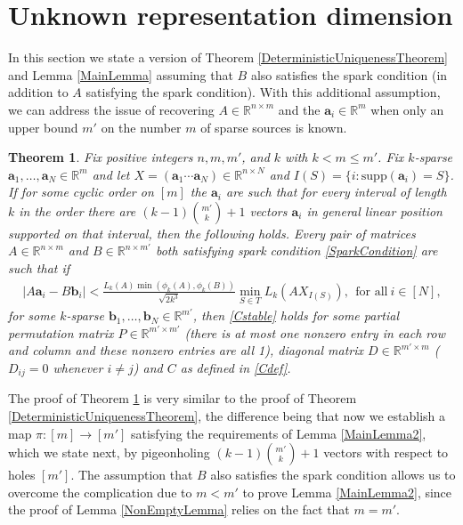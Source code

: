 \documentclass[journal, onecolumn]{IEEEtran}
\newtheorem{theorem}{Theorem}
\begin{document}
\section{Unknown representation dimension}\label{mleqm}

In this section we state a version of Theorem \ref{DeterministicUniquenessTheorem} and Lemma \ref{MainLemma} assuming that $B$ also satisfies the spark condition (in addition to $A$ satisfying the spark condition). With this additional assumption, we can address the issue of recovering $A \in \mathbb{R}^{n \times m}$ and the $\mathbf{a}_i \in \mathbb{R}^m$ when only an upper bound $m'$ on the number $m$ of sparse sources is known.

\begin{theorem}\label{DeterministicUniquenessTheorem2}
Fix positive integers $n, m, m'$, and $k$ with $k < m \leq m'$. Fix $k$-sparse $\mathbf{a}_1, \ldots, \mathbf{a}_N \in \mathbb{R}^m$ and let $X  = (\mathbf{a}_1 \cdots \mathbf{a}_N) \in \mathbb{R}^{n \times N}$ and $I(S) = \{i : \text{supp}(\mathbf{a}_i) = S\}$. If for some cyclic order on $[m]$ the $\mathbf{a}_i$ are such that for every interval of length $k$ in the order there are $(k-1){m' \choose k}+1$ vectors $\mathbf{a}_i$ in general linear position supported on that interval, then the following holds. Every pair of matrices $A \in \mathbb{R}^{n \times m}$ and $B \in \mathbb{R}^{n \times m'}$ both satisfying spark condition \eqref{SparkCondition} are such that if 
\begin{align}
|A\mathbf{a}_i - B\mathbf{b}_i| < \frac{ L_k(A) \min(\phi_k(A), \phi_k(B))}{\sqrt{2k^3} } \min_{S \in T} L_k(AX_{I(S)}), \ \  \text{for all} \  i \in [N],
\end{align}
%
for some $k$-sparse $\mathbf{b}_1, \ldots, \mathbf{b}_N \in \mathbb{R}^{m'}$, then \eqref{Cstable} holds for some partial permutation matrix $P \in \mathbb{R}^{m' \times m'}$ (there is at most one nonzero entry in each row and column and these nonzero entries are all 1), diagonal matrix $D \in \mathbb{R}^{m' \times m}$ ($D_{ij} = 0$ whenever $i \neq j$) and $C$ as defined in \eqref{Cdef}. 
\end{theorem}

The proof of Theorem \ref{DeterministicUniquenessTheorem2} is very similar to the proof of Theorem \ref{DeterministicUniquenessTheorem}, the difference being that now we establish a map $\pi: [m] \to [m']$ satisfying the requirements of Lemma \ref{MainLemma2}, which we state next, by pigeonholing $(k-1){m' \choose k} + 1$ vectors with respect to holes $[m']$. The assumption that $B$ also satisfies the spark condition allows us to overcome the complication due to $m < m'$ to prove Lemma \ref{MainLemma2}, since the proof of Lemma \ref{NonEmptyLemma} relies on the fact that $m = m'$. 
\end{document}
